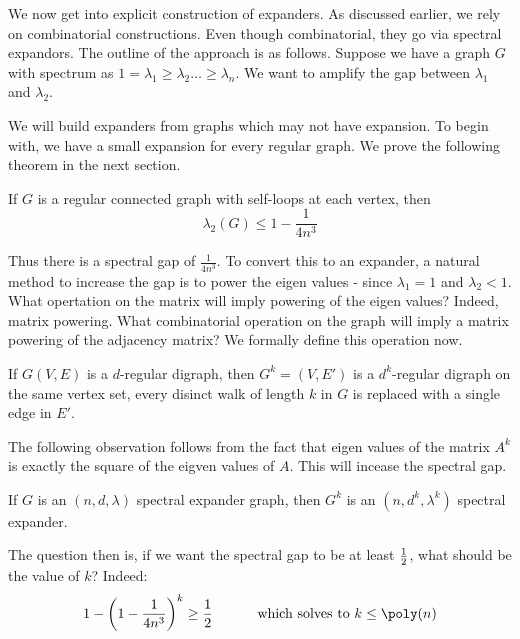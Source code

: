 
We now get into explicit construction of expanders. As discussed earlier, we rely on combinatorial constructions. Even though combinatorial, they go via spectral expandors. The outline of the approach is as follows. Suppose we have a graph $G$ with spectrum as $1=\lambda_1 \ge \lambda_2 \ldots \ge \lambda_n$. We want to amplify the gap between $\lambda_1$ and $\lambda_2$. 

We will build expanders from graphs which may not have expansion. To begin with, we have a small expansion for every regular graph. We prove the following theorem in the next section.

\begin{theorem}
\label{thm:spectralgap-graphs}
If $G$ is a regular connected graph with self-loops at each vertex, then $$\lambda_2(G) \le 1-\frac{1}{4n^3}$$
\end{theorem}

Thus there is a spectral gap of $\frac{1}{4n^3}$. To convert this to an expander, a natural method to increase the gap is to power the eigen values - since $\lambda_1 = 1$ and $\lambda_2 < 1$. What opertation on the matrix will imply powering of the eigen values? Indeed, matrix powering. What combinatorial operation on the graph will imply a matrix powering of the adjacency matrix? We formally define this operation now.

\begin{definition}
If $G(V,E)$ is a $d$-regular
digraph, then $G^k =(V,E')$ is a $d^k$-regular digraph on the same vertex set, every disinct walk of length $k$ in $G$ is replaced with a single edge in $E'$.
\end{definition}

The following observation follows from the fact that eigen values of the matrix $A^k$ is exactly the square of the eigven values of $A$. This will incease the spectral gap.
\begin{lemma}
If $G$ is an $(n,d,\lambda)$ spectral expander graph, then $G^k$ is an $(n,d^k,\lambda^k)$ spectral expander.
\end{lemma}

The question then is, if we want the spectral gap to be at least $\frac{1}{2}$, what should be the value of $k$? Indeed:
$$ 1-\left(1-\frac{1}{4n^3}\right)^k \ge \half \textrm{\hspace{1cm} which solves to $k \le \poly(n)$}$$

